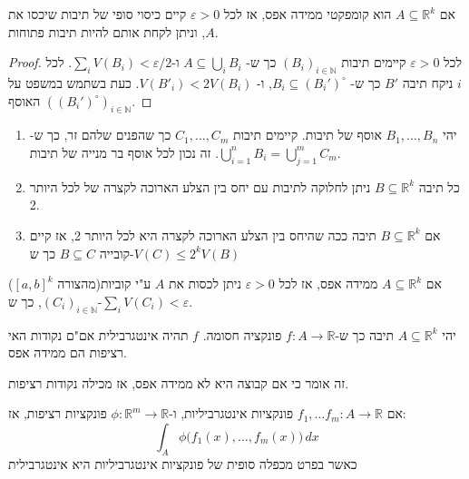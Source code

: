 \documentclass{tstextbook}
\begin{document}
\begin{theorem}
אם \(A\subseteq \mathbb{R}^k\) הוא קומפקטי ממידה אפס, אז לכל \(\varepsilon>0\) קיים כיסוי סופי של תיבות שיכסו את \(A\), וניתן לקחת אותם להיות תיבות פתוחות.

\end{theorem}
\begin{proof}
לכל \(\varepsilon>0\) קיימים תיבות \((B_{i})_{i\in\mathbb{N}}\) כך ש- \(A\subseteq \bigcup_{i}B_{i}\) ו-\(\sum_{i}V(B_{i})<\varepsilon /2\). לכל \(i\) ניקח תיבה \(B'\) כך ש- \(B_{i}\subseteq(B_{i}')^{\circ}\), ו- \(V(B'_{i})<2V(B_{i})\). כעת בשתמש במשפט על האוסף \(\left( (B_{i}')^{\circ} \right)_{i\in\mathbb{N}}\). 

\end{proof}
\begin{proposition}
  \begin{enumerate}
    \item יהי \(B_{1},\dots,B_{n}\) אוסף של תיבות. קיימים תיבות \(C_{1},\dots,C_{m}\) כך שהפנים שלהם זר, כך ש-\(\bigcup_{i=1}^nB_{i}=\bigcup_{j=1}^mC_{m}\). זה נכון לכל אוסף בר מנייה של תיבות. 


    \item כל תיבה \(B\subseteq \mathbb{R}^k\) ניתן לחלוקה לתיבות עם יחס בין הצלע הארוכה לקצרה של לכל היותר 2. 


    \item אם \(B \subseteq \mathbb{R}^k\) תיבה ככה שהיחס בין הצלע הארוכה לקצרה היא לכל היותר 2, אז קיים קובייה \(B\subseteq C\) כך ש-\(V(C)\leq 2^kV(B)\)


  \end{enumerate}
\end{proposition}
\begin{corollary}
אם \(A\subseteq \mathbb{R}^k\) ממידה אפס, אז לכל \(\varepsilon>0\) ניתן לכסות את \(A\) ע"י קוביות(מהצורה \([a,b]^k\)) \((C_{i})_{i\in\mathbb{N}}\), כך ש-\(\sum_{i}V(C_{i})<\varepsilon\). 

\end{corollary}
\begin{theorem}
יהי \(A\subseteq \mathbb{R}^k\) תיבה כך ש-\(f:A\to\mathbb{R}\) פונקציה חסומה. \(f\) תהיה אינטגרבילית אם"ם נקודות האי רציפות הם ממידה אפס.

\end{theorem}
\begin{remark}
זה אומר כי אם קבוצה היא לא ממידה אפס, אז מכילה נקודות רציפות.

\end{remark}
\begin{proposition}
אם \(f_{1},\dots f_{m}:A\to\mathbb{R}\) פונקציות אינטגרביליות, ו-\(\phi:\mathbb{R}^m\to\mathbb{R}\) פונקציות רציפות, אז:
$$\int_{A}\phi\bigl(f_{1}(x),\ldots,f_{m}(x)\bigr)\,d x$$
כאשר בפרט מכפלה סופית של פונקציות אינטגרביליות היא אינטגרבילית

\end{proposition}
\end{document}
